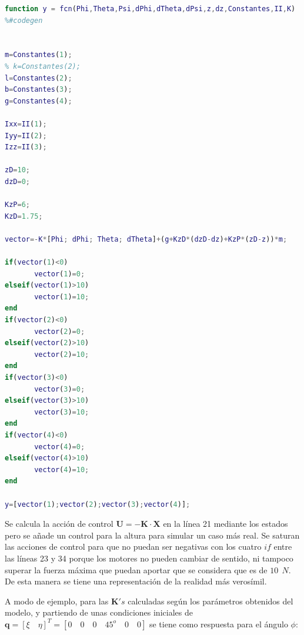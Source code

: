 \documentclass[twoside,11pt]{book}
\begin{document}
\begin{lstlisting}[language=Matlab]
function y = fcn(Phi,Theta,Psi,dPhi,dTheta,dPsi,z,dz,Constantes,II,K)
%#codegen


m=Constantes(1);
% k=Constantes(2);
l=Constantes(2);
b=Constantes(3);
g=Constantes(4);

Ixx=II(1);
Iyy=II(2);
Izz=II(3);

zD=10;
dzD=0;

KzP=6;
KzD=1.75;

vector=-K*[Phi; dPhi; Theta; dTheta]+(g+KzD*(dzD-dz)+KzP*(zD-z))*m;

if(vector(1)<0) 
       vector(1)=0;
elseif(vector(1)>10)
       vector(1)=10;
end
if(vector(2)<0) 
       vector(2)=0;
elseif(vector(2)>10)
       vector(2)=10;       
end
if(vector(3)<0) 
       vector(3)=0;
elseif(vector(3)>10)
       vector(3)=10;       
end
if(vector(4)<0) 
       vector(4)=0;       
elseif(vector(4)>10)
       vector(4)=10;       
end
 
y=[vector(1);vector(2);vector(3);vector(4)];
\end{lstlisting}

Se calcula la acción de control $\mathbf{U}=-\mathbf{K} \cdot \mathbf{X}$ en la línea 21 mediante los estados pero se añade un control para la altura para simular un caso más real. Se saturan las acciones de control para que no puedan ser negativas con los cuatro $if$ entre las líneas 23 y 34 porque los motores no pueden cambiar de sentido, ni tampoco superar la fuerza máxima que puedan aportar que se considera que es de $10\>\>N$. De esta manera se tiene una representación de la realidad más verosímil. 

A modo de ejemplo, para las $\mathbf{K}'s$ calculadas según los parámetros obtenidos del modelo,
y partiendo de unas condiciones iniciales de $\mathbf{q}=[\xi \quad \eta]^{T}=[0 \quad 0 \quad 0 \quad 45^{o} \quad 0 \quad 0 ]$ se tiene como respuesta para el ángulo $\phi$: 
\end{document}
